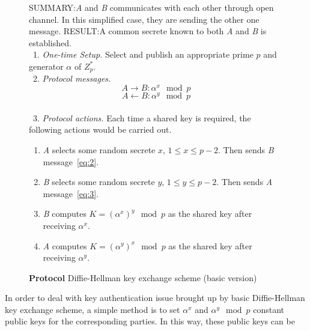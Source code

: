 \documentclass[12pt,journal,compsoc]{IEEEtran}
\begin{document}
\begin{figure*}[!t]
  \centering
  \begin{algorithmic}
    \STATE SUMMARY:\@ \emph{A} and \emph{B} communicates with each other
    through open channel. In this simplified case, they are sending
    the other one message.
    \STATE RESULT:\@ A common secrete known to both \emph{A} and
    \emph{B} is established.\\
    \STATE~\quad{}1. \emph{One-time Setup.} Select and publish an
    appropriate prime $p$ and generator $\alpha$ of $Z^{*}_{p}$.\\
    \STATE~\quad{}2. \emph{Protocol messages.}
    \begin{equation}
      \label{eq:2}
      A \rightarrow B: \alpha^{x}\mod p 
    \end{equation}
    \begin{equation}
      \label{eq:3}
      A \leftarrow B: \alpha^{y}\mod p
    \end{equation}\\
    \STATE~\quad{}3. \emph{Protocol actions.} Each time a shared key
    is required, the following actions would be carried out.
    \begin{enumerate}
    \item \emph{A} selects some random secrete $x$, $1\leq x\leq
      p-2$. Then sends \emph{B} message~\eqref{eq:2}.
    \item \emph{B} selects some random secrete $y$, $1\leq y\leq
      p-2$. Then sends \emph{A} message~\eqref{eq:3}.
    \item \emph{B} computes $K={(\alpha^{x})}^{y}\mod p$ as the shared
      key after receiving $\alpha^{x}$.
    \item \emph{A} computes $K={(\alpha^{y})}^{x}\mod p$ as the shared
      key after receiving $\alpha^{y}$.
    \end{enumerate}
  \end{algorithmic}
  \caption{\textbf{Protocol} Diffie-Hellman key exchange scheme (basic
    version)}
  \label{fig:diffie-key-agreement}
\end{figure*}
\par
In order to deal with key authentication issue brought up by basic
Diffie-Hellman key exchange scheme, a simple method is to set
$\alpha^{x}$ and $\alpha^{y}\mod p$ constant public keys for the
corresponding parties. In this way, these public keys can be
\end{document}
